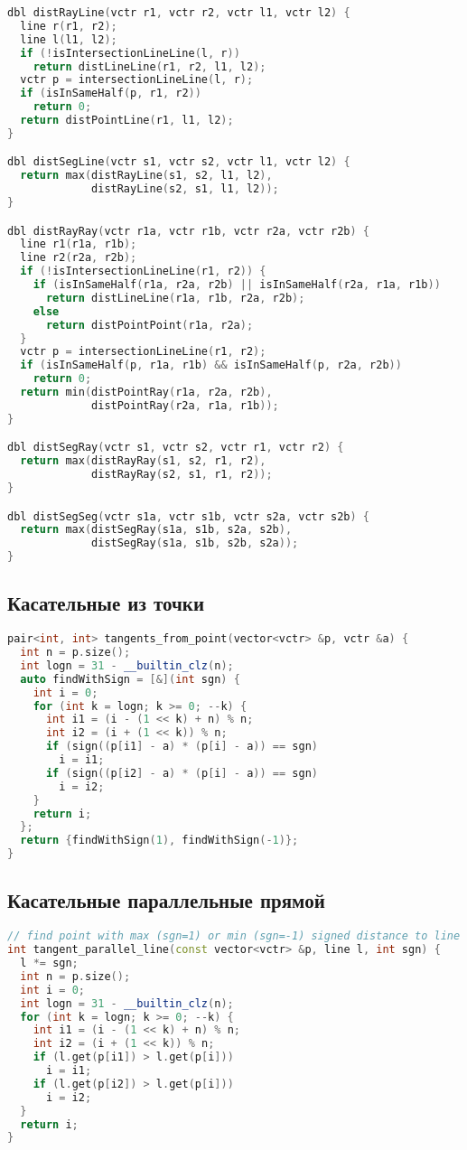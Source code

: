 \documentclass[9pt,a4paper,landscape,twosided]{extarticle}
\begin{document}
\begin{multicols*}{3}
\begin{lstlisting}[language=C++]
dbl distRayLine(vctr r1, vctr r2, vctr l1, vctr l2) {
  line r(r1, r2);
  line l(l1, l2);
  if (!isIntersectionLineLine(l, r))
    return distLineLine(r1, r2, l1, l2);
  vctr p = intersectionLineLine(l, r);
  if (isInSameHalf(p, r1, r2))
    return 0;
  return distPointLine(r1, l1, l2);
}

dbl distSegLine(vctr s1, vctr s2, vctr l1, vctr l2) {
  return max(distRayLine(s1, s2, l1, l2),
             distRayLine(s2, s1, l1, l2));
}

dbl distRayRay(vctr r1a, vctr r1b, vctr r2a, vctr r2b) {
  line r1(r1a, r1b);
  line r2(r2a, r2b);
  if (!isIntersectionLineLine(r1, r2)) {
    if (isInSameHalf(r1a, r2a, r2b) || isInSameHalf(r2a, r1a, r1b))
      return distLineLine(r1a, r1b, r2a, r2b);
    else
      return distPointPoint(r1a, r2a);
  }
  vctr p = intersectionLineLine(r1, r2);
  if (isInSameHalf(p, r1a, r1b) && isInSameHalf(p, r2a, r2b))
    return 0;
  return min(distPointRay(r1a, r2a, r2b),
             distPointRay(r2a, r1a, r1b));
}

dbl distSegRay(vctr s1, vctr s2, vctr r1, vctr r2) {
  return max(distRayRay(s1, s2, r1, r2),
             distRayRay(s2, s1, r1, r2));
}

dbl distSegSeg(vctr s1a, vctr s1b, vctr s2a, vctr s2b) {
  return max(distSegRay(s1a, s1b, s2a, s2b),
             distSegRay(s1a, s1b, s2b, s2a));
}

\end{lstlisting}

\subsection{Касательные из точки}
\begin{lstlisting}[language=C++]
pair<int, int> tangents_from_point(vector<vctr> &p, vctr &a) {
  int n = p.size();
  int logn = 31 - __builtin_clz(n);
  auto findWithSign = [&](int sgn) {
    int i = 0;
    for (int k = logn; k >= 0; --k) {
      int i1 = (i - (1 << k) + n) % n;
      int i2 = (i + (1 << k)) % n;
      if (sign((p[i1] - a) * (p[i] - a)) == sgn)
        i = i1;
      if (sign((p[i2] - a) * (p[i] - a)) == sgn)
        i = i2;
    }
    return i;
  };
  return {findWithSign(1), findWithSign(-1)};
}

\end{lstlisting}

\subsection{Касательные параллельные прямой}
\begin{lstlisting}[language=C++]
// find point with max (sgn=1) or min (sgn=-1) signed distance to line
int tangent_parallel_line(const vector<vctr> &p, line l, int sgn) {
  l *= sgn;
  int n = p.size();
  int i = 0;
  int logn = 31 - __builtin_clz(n);
  for (int k = logn; k >= 0; --k) {
    int i1 = (i - (1 << k) + n) % n;
    int i2 = (i + (1 << k)) % n;
    if (l.get(p[i1]) > l.get(p[i]))
      i = i1;
    if (l.get(p[i2]) > l.get(p[i]))
      i = i2;
  }
  return i;
}


\end{lstlisting}
\end{multicols*}
\end{document}
